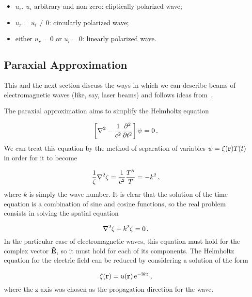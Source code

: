 \documentclass[12pt, class=report, crop=false]{standalone}
\begin{document}
\begin{itemize}
  \item \(u_r\), \(u_i\) arbitrary and non-zero: eliptically polarized wave;
  \item \(u_r=u_i\neq 0\): circularly polarized wave;
  \item either \(u_r=0\) or \(u_i=0\): linearly polarized wave.
\end{itemize}

\subsection{Paraxial Approximation}

This and the next section discuss the ways in which we can describe beams of electromagnetic waves (like, say, laser beams) and follows ideas from~\cite{goldsmithQuasiopticalSystemsGaussian1998}.

\par
The paraxial approximation aims to simplify the Helmholtz equation

\begin{equation}
  \left[\laplacian{} - \frac{1}{c^2} \pdv[2]{t} \right] \vb{\psi} = 0\,.
\end{equation}
We can treat this equation by the method of separation of variables \(\psi = \zeta (\vb{r}) T(t)\) in order for it to become

\begin{equation}
  \frac{1}{\zeta} \laplacian{\zeta} = \frac{1}{c^2} \frac{T''}{T} = - k^2 \,,
\end{equation}
where \(k\) is simply the wave number. It is clear that the solution of the time equation is a combination of sine and cosine functions, so the real problem consists in solving the spatial equation

\begin{equation}
\label{Helmholtz}
  \laplacian{\zeta} + k^2 \zeta =0 \,.
\end{equation}
In the particular case of electromagnetic waves, this equation must hold for the complex vector \(\vb{\tilde{E}}\), so it must hold for each of its components. The Helmholtz equation for the electric field can be reduced by considering a solution of the form

\begin{equation}
\label{simplifing-solution}
  \zeta (\vb{r}) = u (\vb{r}) \operatorname{e}^{-\mathrm{i} kz} \,,
\end{equation}
where the z-axis was chosen as the propagation direction for the wave.
\end{document}
